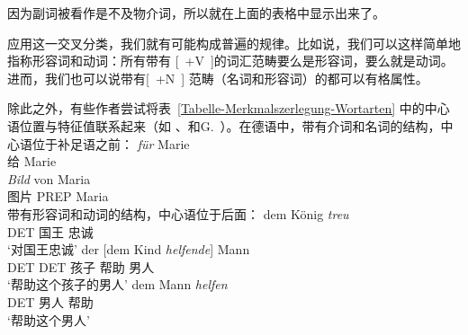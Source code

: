 \noindent
因为副词被看作是不及物介词\label{Seite-Adverbien-PP}，所以就在上面的表格中显示出来了。

应用这一交叉分类，我们就有可能构成普遍的规律。比如说，我们可以这样简单地指称形容词和动词：所有带有 [~+V~]的词汇范畴要么是形容词，要么就是动词。进而，我们也可以说带有[~+N~] 范畴（名词和形容词）的都可以有格属性。

除此之外，有些作者尝试将表~\ref{Tabelle-Merkmalszerlegung-Wortarten} 中的中心语位置与特征值联系起来（如 \citealp[]{Grewendorf88a}、\citealp[]{Haftka96a}和G.\ \citealp[]{GMueller2011a}）。在德语中，带有介词和名词的结构，中心语位于补足语之前：
\eal
\ex
\gll \emph{für} Marie\\
	 给 Marie\\
\ex 
\gll \emph{Bild} von Maria\\
	 图片 PREP Maria\\
\zl
带有形容词和动词的结构，中心语位于后面：
\eal
\ex 
\gll dem König \emph{treu}\\
     DET 国王 忠诚\\
\glt `对国王忠诚'
\ex 
\gll der [dem Kind \emph{helfende}] Mann\\
     DET DET 孩子 帮助 男人\\
\glt `帮助这个孩子的男人'
\ex 
\gll dem Mann \emph{helfen}\\
      DET 男人 帮助\\
\glt `帮助这个男人'

